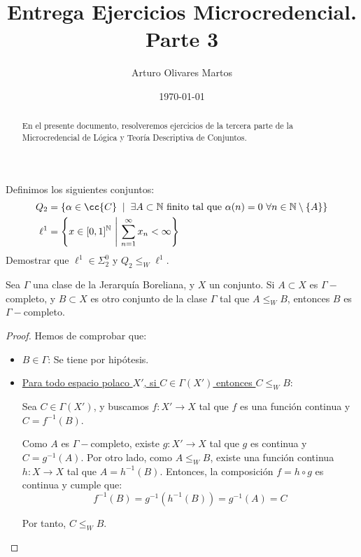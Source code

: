 \documentclass[12pt]{article}
\author{Arturo Olivares Martos}
\date{\today}
\title{Entrega Ejercicios Microcredencial. Parte 3}
\begin{document}
    \maketitle
    \begin{abstract}
        En el presente documento, resolveremos ejercicios de la tercera parte de la Microcredencial de Lógica y Teoría Descriptiva de Conjuntos.
    \end{abstract}



    \begin{ejercicio}
        Definimos los siguientes conjuntos:
        \begin{align*}
           Q_2 &= \left\{ \alpha \in \cc{C} \;\mid\; \exists A\subset \mathbb{N}\ \text{finito tal que}\ \alpha(n)=0\ \forall n\in \mathbb{N}\setminus\{A\}\right\} \\
           \ell^1 &= \left\{ x\in [0,1]^\mathbb{N}\ \middle|\ \sum_{n=1}^\infty x_n < \infty\right\}
        \end{align*}
        Demostrar que $\ell^1\in \Sigma_2^0$ y $Q_2 \leq_W \ell^1$.
    \end{ejercicio}

    \begin{ejercicio}
        Sea $\Gamma$ una clase de la Jerarquía Boreliana, y $X$ un conjunto. Si $A\subset X$ es $\Gamma-$completo, y $B\subset X$ es otro conjunto de la clase $\Gamma$ tal que $A\leq_W B$, entonces $B$ es $\Gamma-$completo.
        \begin{proof}
            Hemos de comprobar que:
        \begin{itemize}
            \item \ul{$B\in \Gamma$}: Se tiene por hipótesis.
            \item \ul{Para todo espacio polaco $X'$, si $C\in \Gamma(X')$ entonces $C\leq_W B$}:
            
            Sea $C\in \Gamma(X')$, y buscamos $f:X'\to X$ tal que $f$ es una función continua y $C=f^{-1}(B)$.
            
            Como $A$ es $\Gamma-$completo, existe $g:X'\to X$ tal que $g$ es continua y $C=g^{-1}(A)$. Por otro lado, como $A\leq_W B$, existe una función continua $h:X\to X$ tal que $A=h^{-1}(B)$. Entonces, la composición $f=h\circ g$ es continua y cumple que:
            \begin{equation*}
                f^{-1}(B) = g^{-1}(h^{-1}(B)) = g^{-1}(A) = C
            \end{equation*}

            Por tanto, $C\leq_W B$.
        \end{itemize}
        \end{proof}
    \end{ejercicio}
\end{document}
